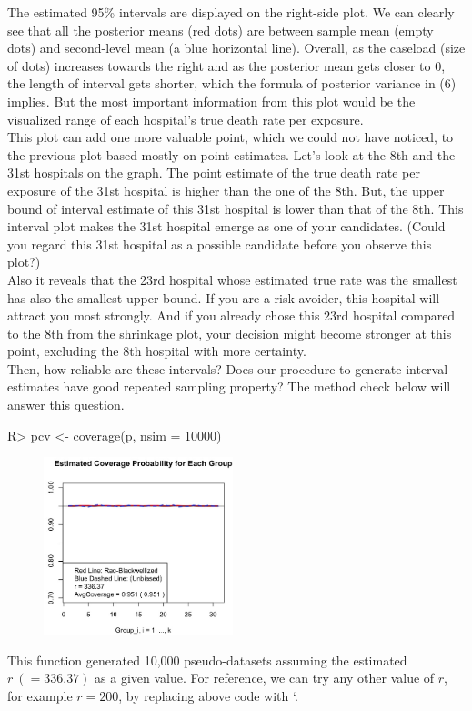 \documentclass[article]{jss}
\begin{document}
The estimated 95\% intervals are displayed on the right-side plot. We can clearly see that all the posterior means (red dots) are between sample mean (empty dots) and second-level mean (a blue horizontal line). Overall, as the caseload (size of dots) increases towards the right and as the posterior mean gets closer to 0, the length of interval gets shorter, which the formula of posterior variance in (6) implies. But the most important information from this plot would be the visualized range of each hospital's true death rate per exposure. 
\\

This plot can add one more valuable point, which we could not have noticed, to the previous plot based mostly on point estimates. Let's look at the 8th and the 31st hospitals on the graph. The point estimate of the true death rate per exposure of the 31st hospital is higher than the one of the 8th. But, the upper bound of interval estimate of this 31st hospital is lower than that of the 8th. This interval plot makes the 31st hospital emerge as one of your candidates. (Could you regard this 31st hospital as a possible candidate before you observe this plot?)
\\

Also it reveals that the 23rd hospital whose estimated true rate was the smallest has also the smallest upper bound. If you are a risk-avoider, this hospital will attract you most strongly. And if you already chose this 23rd hospital compared to the 8th from the shrinkage plot, your decision might become stronger at this point, excluding the 8th hospital with more certainty. 
\\

Then, how reliable are these intervals? Does our procedure to generate interval estimates have good repeated sampling property? The method check below will answer this question.
\begin{CodeChunk}
\begin{CodeInput}
R> pcv <- coverage(p, nsim = 10000)
\end{CodeInput}
\end{CodeChunk}
\begin{figure}[h]
\begin{center}
\includegraphics[width = 5.5cm]{hospital3.png}
\end{center}
\end{figure}
This  function generated 10,000 pseudo-datasets assuming the estimated $r~(=336.37)$ as a given value. For reference, we can try any other value of $r$, for example $r=200$, by replacing above code with `.
\\
\end{document}
